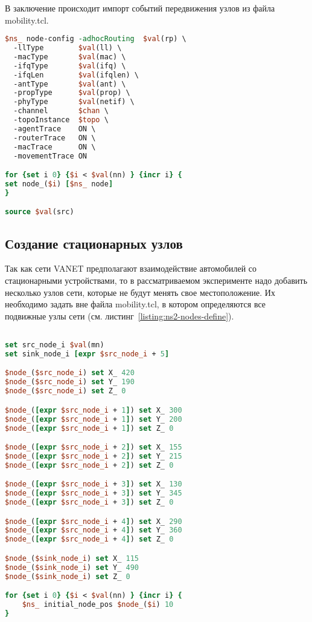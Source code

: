 В заключение происходит импорт событий передвижения узлов из файла mobility.tcl.

\begin{lstlisting}[language=tcl, style=mystyle, caption=Настройка узлов сети, label=listing:ns2-node-config]
$ns_ node-config -adhocRouting  $val(rp) \
  -llType        $val(ll) \
  -macType       $val(mac) \
  -ifqType       $val(ifq) \
  -ifqLen        $val(ifqlen) \
  -antType       $val(ant) \
  -propType      $val(prop) \
  -phyType       $val(netif) \
  -channel       $chan \
  -topoInstance  $topo \
  -agentTrace    ON \
  -routerTrace   ON \
  -macTrace      ON \
  -movementTrace ON

for {set i 0} {$i < $val(nn) } {incr i} {
set node_($i) [$ns_ node]	
}

source $val(src)
\end{lstlisting}


\subsection{Создание стационарных узлов}

Так как сети VANET предполагают взаимодействие автомобилей со стационарными устройствами, то в рассматриваемом эксперименте надо добавить несколько узлов сети, которые не будут менять свое местоположение. Их необходимо задать вне файла mobility.tcl, в котором определяются все подвижные узлы сети (см. листинг~\ref{listing:ns2-nodes-define}).

\begin{lstlisting}[language=tcl, style=mystyle, caption=Настройка узлов сети, label=listing:ns2-nodes-define]

set src_node_i $val(mn)
set sink_node_i [expr $src_node_i + 5]

$node_($src_node_i) set X_ 420
$node_($src_node_i) set Y_ 190
$node_($src_node_i) set Z_ 0

$node_([expr $src_node_i + 1]) set X_ 300
$node_([expr $src_node_i + 1]) set Y_ 200
$node_([expr $src_node_i + 1]) set Z_ 0

$node_([expr $src_node_i + 2]) set X_ 155
$node_([expr $src_node_i + 2]) set Y_ 215
$node_([expr $src_node_i + 2]) set Z_ 0

$node_([expr $src_node_i + 3]) set X_ 130
$node_([expr $src_node_i + 3]) set Y_ 345
$node_([expr $src_node_i + 3]) set Z_ 0

$node_([expr $src_node_i + 4]) set X_ 290
$node_([expr $src_node_i + 4]) set Y_ 360
$node_([expr $src_node_i + 4]) set Z_ 0

$node_($sink_node_i) set X_ 115
$node_($sink_node_i) set Y_ 490
$node_($sink_node_i) set Z_ 0

for {set i 0} {$i < $val(nn) } {incr i} {
    $ns_ initial_node_pos $node_($i) 10
}
\end{lstlisting}


